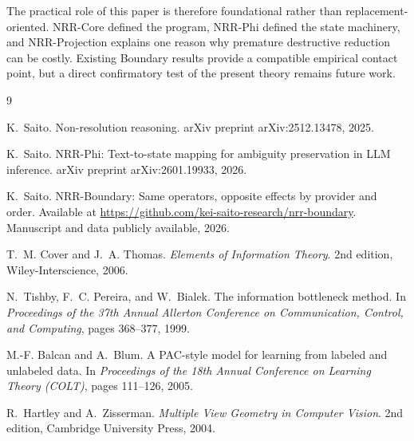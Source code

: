\documentclass[11pt,a4paper]{article}
\begin{document}
The practical role of this paper is therefore foundational rather than replacement-oriented. NRR-Core \cite{saito2025nrr} defined the program, NRR-Phi \cite{saito2026phi} defined the state machinery, and NRR-Projection explains one reason why premature destructive reduction can be costly. Existing Boundary results \cite{saito2026boundary} provide a compatible empirical contact point, but a direct confirmatory test of the present theory remains future work.

\begin{thebibliography}{9}

K.~Saito.
\newblock Non-resolution reasoning.
\newblock arXiv preprint arXiv:2512.13478, 2025.

K.~Saito.
\newblock NRR-Phi: Text-to-state mapping for ambiguity preservation in LLM inference.
\newblock arXiv preprint arXiv:2601.19933, 2026.

K.~Saito.
\newblock NRR-Boundary: Same operators, opposite effects by provider and order.
\newblock Available at \url{https://github.com/kei-saito-research/nrr-boundary}. Manuscript and data publicly available, 2026.

T.~M. Cover and J.~A. Thomas.
\newblock \emph{Elements of Information Theory}.
\newblock 2nd edition, Wiley-Interscience, 2006.

N.~Tishby, F.~C. Pereira, and W.~Bialek.
\newblock The information bottleneck method.
\newblock In \emph{Proceedings of the 37th Annual Allerton Conference on Communication, Control, and Computing}, pages 368--377, 1999.

M.-F. Balcan and A.~Blum.
\newblock A {PAC}-style model for learning from labeled and unlabeled data.
\newblock In \emph{Proceedings of the 18th Annual Conference on Learning Theory (COLT)}, pages 111--126, 2005.

R.~Hartley and A.~Zisserman.
\newblock \emph{Multiple View Geometry in Computer Vision}.
\newblock 2nd edition, Cambridge University Press, 2004.

\end{thebibliography}
\end{document}

